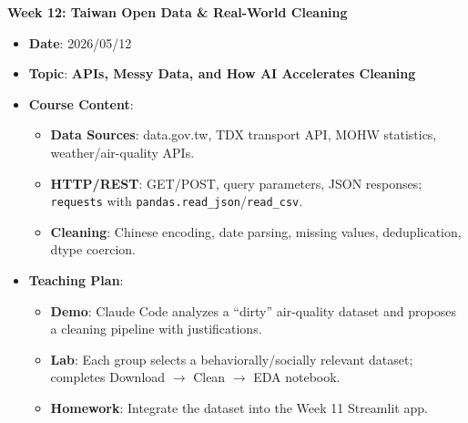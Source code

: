 \noindent\textbf{Week 12: Taiwan Open Data \& Real-World Cleaning}
\begin{itemize}
    \item \textbf{Date}: 2026/05/12
    \item \textbf{Topic}: \textbf{APIs, Messy Data, and How AI Accelerates Cleaning}
    \item \textbf{Course Content}:
    \begin{itemize}
        \item \textbf{Data Sources}: data.gov.tw, TDX transport API, MOHW statistics, weather/air-quality APIs.
        \item \textbf{HTTP/REST}: GET/POST, query parameters, JSON responses; \texttt{requests} with \texttt{pandas.read\_json}/\texttt{read\_csv}.
        \item \textbf{Cleaning}: Chinese encoding, date parsing, missing values, deduplication, dtype coercion.
    \end{itemize}
    \item \textbf{Teaching Plan}:
    \begin{itemize}
        \item \textbf{Demo}: Claude Code analyzes a ``dirty'' air-quality dataset and proposes a cleaning pipeline with justifications.
        \item \textbf{Lab}: Each group selects a behaviorally/socially relevant dataset; completes Download $\rightarrow$ Clean $\rightarrow$ EDA notebook.
        \item \textbf{Homework}: Integrate the dataset into the Week 11 Streamlit app.
    \end{itemize}
\end{itemize}

